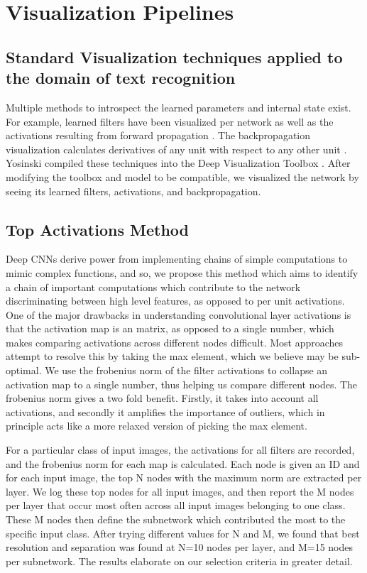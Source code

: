 \documentclass[10pt,twocolumn,letterpaper]{article}
\begin{document}
\section{Visualization Pipelines}


\subsection{Standard Visualization techniques applied to the domain of text recognition}
Multiple methods to introspect the learned parameters and internal state exist. For example, learned filters have been visualized per network as well as the activations resulting from forward propagation \cite{yosinski2015understanding}. The backpropagation visualization calculates derivatives of any unit with respect to any other unit \cite{DBLP:journals/corr/ZeilerF13}. Yosinski compiled these techniques into the Deep Visualization Toolbox \cite{yosinski2015understanding}. After modifying the toolbox and model to be compatible, we visualized the network by seeing its learned filters, activations, and backpropagation.


\subsection{Top Activations Method}
Deep CNNs derive power from implementing chains of simple computations to mimic complex functions, and so, we propose this method which aims to identify a chain of important computations which contribute to the network discriminating between high level features, as opposed to per unit activations. One of the major drawbacks in understanding convolutional layer activations is that the activation map is an matrix, as opposed to a single number, which makes comparing activations across different nodes difficult. Most approaches attempt to resolve this by taking the max element, which we believe may be sub-optimal. We use the frobenius norm of the filter activations to collapse an activation map to a single number, thus helping us compare different nodes. The frobenius norm gives a two fold benefit. Firstly, it takes into account all activations, and secondly it amplifies the importance of outliers, which in principle acts like a more relaxed version of picking the max element. 

For a particular class of input images, the activations for all filters are recorded, and the frobenius norm for each map is calculated. Each node is given an ID and for each input image, the top N nodes with the maximum norm are extracted per layer. We log these top nodes for all input images, and then report the M nodes per layer that occur most often across all input images belonging to one class. These M nodes then define the subnetwork which contributed the most to the specific input class. After trying different values for N and M, we found that best resolution and separation was found at N=10 nodes per layer, and M=15 nodes per subnetwork. The results elaborate on our selection criteria in greater detail.
\end{document}
